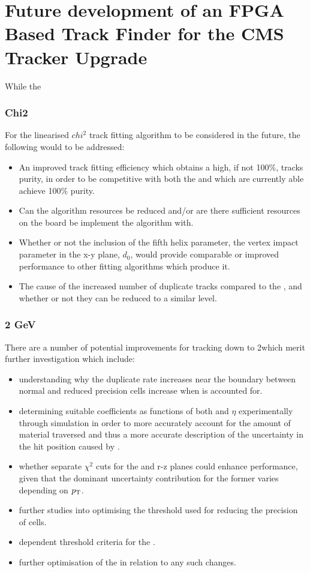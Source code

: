 \section{Future development of an FPGA Based Track Finder for the CMS Tracker Upgrade}
While the 
\subsubsection{Chi2}\label{subsubsec:chi2future}
For the linearised $chi^{2}$ track fitting algorithm to be considered in the future, the following would to be addressed:
\begin{itemize}
\item An improved track fitting efficiency which obtains a high, if not 100\%, tracks purity, in order to be competitive with both the \KF and \LR which are currently able achieve 100\% purity.
\item Can the algorithm resources be reduced and/or are there sufficient resources on the board be implement the algorithm with.
\item Whether or not the inclusion of the fifth helix parameter, the vertex impact parameter in the x-y plane, $d_{0}$, would provide comparable or improved performance to other fitting algorithms which produce it.
\item The cause of the increased number of duplicate tracks compared to the \KF, and whether or not they can be reduced to a similar level.
\end{itemize}

\subsubsection{2 GeV}\label{subsubsec:2GeVoutlook}
There are a number of potential improvements for tracking down to 2\GeV which merit further investigation which include:
\begin{itemize}
\item understanding why the duplicate rate increases near the boundary between normal and reduced precision \HT cells increase when \MS is accounted for.
\item determining suitable coefficients as functions of both \pT and $\eta$ experimentally through simulation in order to more accurately account for the amount of material traversed and thus a more accurate description of the uncertainty in the hit position caused by \MS.
\item whether separate \KF $\chi^{2}$ cuts for the \rphi and r-z planes could enhance performance, given that the dominant uncertainty contribution for the former varies depending on $p_{\mathrm{T}}$.
\item further studies into optimising the \pT threshold used for reducing the precision of \HT cells.
\item \pt dependent threshold criteria for the \HT.
\item further optimisation of the \KF in relation to any such changes.
\end{itemize}
